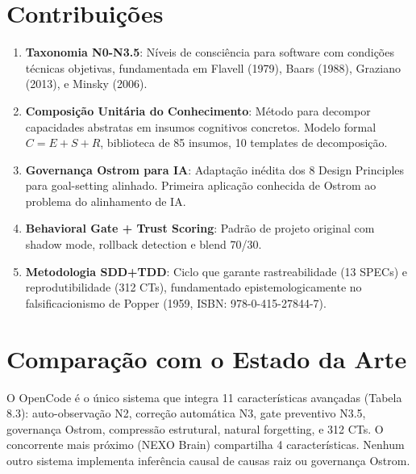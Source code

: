 \section{Contribuições}  

\begin{enumerate}
    \item \textbf{Taxonomia N0-N3.5}: Níveis de consciência para software com condições técnicas objetivas, fundamentada em Flavell (1979), Baars (1988), Graziano (2013), e Minsky (2006).
    \item \textbf{Composição Unitária do Conhecimento}: Método para decompor capacidades abstratas em insumos cognitivos concretos. Modelo formal $C = E + S + R$, biblioteca de 85 insumos, 10 templates de decomposição.
    \item \textbf{Governança Ostrom para IA}: Adaptação inédita dos 8 Design Principles para goal-setting alinhado. Primeira aplicação conhecida de Ostrom ao problema do alinhamento de IA.
    \item \textbf{Behavioral Gate + Trust Scoring}: Padrão de projeto original com shadow mode, rollback detection e blend 70/30.
    \item \textbf{Metodologia SDD+TDD}: Ciclo que garante rastreabilidade (13 SPECs) e reprodutibilidade (312 CTs), fundamentado epistemologicamente no falsificacionismo de Popper (1959, ISBN: 978-0-415-27844-7).
\end{enumerate}

\section{Comparação com o Estado da Arte}

O OpenCode é o único sistema que integra 11 características avançadas (Tabela 8.3): auto-observação N2, correção automática N3, gate preventivo N3.5, governança Ostrom, compressão estrutural, natural forgetting, e 312 CTs. O concorrente mais próximo (NEXO Brain) compartilha 4 características. Nenhum outro sistema implementa inferência causal de causas raiz ou governança Ostrom.

